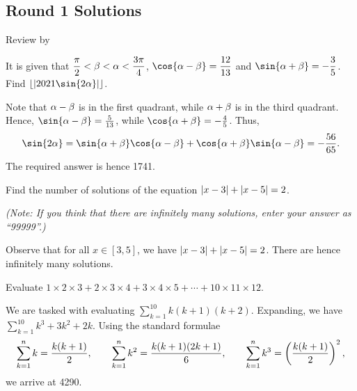 \subsection{Round 1 Solutions}\label{S::2021-O-1}

\begin{resources}
    Review by 
\end{resources}

\begin{question}[1741]\label{A::2021-O-1-1}
    It is given that $\dfrac\pi2 < \beta < \alpha < \dfrac{3\pi}{4}$, $\cos{\a - \b} = \dfrac{12}{13}$ and $\sin{\a + \b} = -\dfrac35$. Find $\floor{\abs{2021\sin{2\a}}}$.
\end{question}
\begin{solution*}
    Note that $\alpha - \beta$ is in the first quadrant, while $\alpha + \beta$ is in the third quadrant. Hence, $\sin{\a - \b} = \frac{5}{13}$, while $\cos{\a + \b} = -\frac45$. Thus, \[\sin{2\a} = \sin{\a + \b} \cos{\a - \b} + \cos{\a + \b} \sin{\a - \b} = -\frac{56}{65}.\] The required answer is hence 1741.
\end{solution*}

\begin{question}[99999]\label{A::2021-O-1-2}
    Find the number of solutions of the equation $\left\lvert x - 3 \right\rvert + \left\lvert x - 5 \right\rvert = 2$.

    \noindent \textit{(Note: If you think that there are infinitely many solutions, enter your answer as ``99999''.)}
\end{question}
\begin{solution*}
    Observe that for all $x \in [3, 5]$, we have $\left\lvert x - 3 \right\rvert + \left\lvert x - 5 \right\rvert = 2$. There are hence infinitely many solutions.
\end{solution*}

\begin{question}[4290]\label{A::2021-O-1-3}
    Evaluate $1 \times 2 \times 3 + 2 \times 3 \times 4 + 3 \times 4 \times 5 + \cdots + 10 \times 11 \times 12$.
\end{question}
\begin{solution*}
    We are tasked with evaluating $\displaystyle\sum_{k = 1}^{10} k(k+1)(k+2)$. Expanding, we have $\displaystyle\sum_{k = 1}^{10} k^3 + 3k^2 + 2k$. Using the standard formulae \[\sum_{k=1}^n k = \frac{k(k+1)}{2}, \qquad \sum_{k=1}^n k^2 = \frac{k(k+1)(2k+1)}{6}, \qquad \sum_{k=1}^n k^3 = \left( \frac{k(k+1)}{2} \right)^2,\] we arrive at 4290.
\end{solution*}

